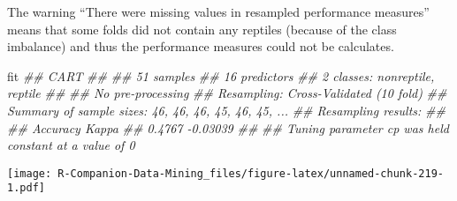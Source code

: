 \documentclass[
  notitlepage]{book}
\newenvironment{Shaded}{\begin{snugshade}}{\end{snugshade}}
\newcommand{\CommentTok}[1]{\textcolor[rgb]{0.56,0.35,0.01}{\textit{#1}}}
\newcommand{\DataTypeTok}[1]{\textcolor[rgb]{0.13,0.29,0.53}{#1}}
\newcommand{\DecValTok}[1]{\textcolor[rgb]{0.00,0.00,0.81}{#1}}
\newcommand{\KeywordTok}[1]{\textcolor[rgb]{0.13,0.29,0.53}{\textbf{#1}}}
\newcommand{\NormalTok}[1]{#1}
\newcommand{\OperatorTok}[1]{\textcolor[rgb]{0.81,0.36,0.00}{\textbf{#1}}}
\begin{document}
The warning ``There were missing values in resampled performance
measures'' means that some folds did not contain any reptiles (because of
the class imbalance) and thus the performance measures could not be
calculates.

\begin{Shaded}
\begin{Highlighting}[]
\NormalTok{fit}
\CommentTok{\#\# CART }
\CommentTok{\#\# }
\CommentTok{\#\# 51 samples}
\CommentTok{\#\# 16 predictors}
\CommentTok{\#\#  2 classes: \textquotesingle{}nonreptile\textquotesingle{}, \textquotesingle{}reptile\textquotesingle{} }
\CommentTok{\#\# }
\CommentTok{\#\# No pre{-}processing}
\CommentTok{\#\# Resampling: Cross{-}Validated (10 fold) }
\CommentTok{\#\# Summary of sample sizes: 46, 46, 46, 45, 46, 45, ... }
\CommentTok{\#\# Resampling results:}
\CommentTok{\#\# }
\CommentTok{\#\#   Accuracy  Kappa   }
\CommentTok{\#\#   0.4767    {-}0.03039}
\CommentTok{\#\# }
\CommentTok{\#\# Tuning parameter \textquotesingle{}cp\textquotesingle{} was held constant at a value of 0}
\end{Highlighting}
\end{Shaded}

\begin{Shaded}
\end{Shaded}

\texttt{[image: R-Companion-Data-Mining\_files/figure-latex/unnamed-chunk-219-1.pdf]}
\end{document}
